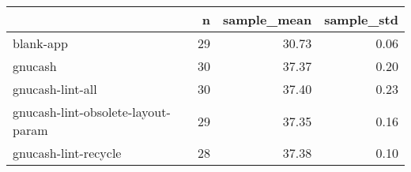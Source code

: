\begin{tabular}{lrrr}
\toprule
{} &   n &  sample\_mean &  sample\_std \\
\midrule
blank-app                          &  29 &        30.73 &        0.06 \\
gnucash                            &  30 &        37.37 &        0.20 \\
gnucash-lint-all                   &  30 &        37.40 &        0.23 \\
gnucash-lint-obsolete-layout-param &  29 &        37.35 &        0.16 \\
gnucash-lint-recycle               &  28 &        37.38 &        0.10 \\
\bottomrule
\end{tabular}

